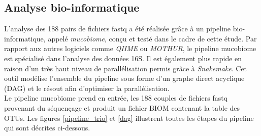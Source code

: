 \documentclass[12pt,a4paper]{article}
\begin{document}
\subsection{Analyse bio-informatique}
L’analyse des 188 pairs de fichiers fastq a été réalisée grâce à un pipeline bio-informatique, appelé \textit{mucobiome}, conçu et testé dans le cadre de cette étude. Par rapport aux autres logiciels comme \textit{QIIME}\cite{Caporaso2010} ou \textit{MOTHUR}\cite{Schloss2009}, le pipeline mucobiome est spécialisé dans l’analyse des données 16S. Il est également plus rapide en raison d’un très haut niveau de parallélisation permis grâce à  \textit{Snakemake}\cite{Koster2012}. Cet outil modélise l'ensemble du pipeline sous forme d'un graphe direct acyclique (DAG) et le résout afin d'optimiser la parallélisation. \\
Le pipeline mucobiome prend en entrée, les 188 couples de fichiers fastq provenant du séquençage et produit un fichier BIOM contenant la table des OTUs. Les figures \ref{pipeline_trio} et \ref{dag} illustrent toutes les étapes du pipeline qui sont décrites ci-dessous.
\end{document}
